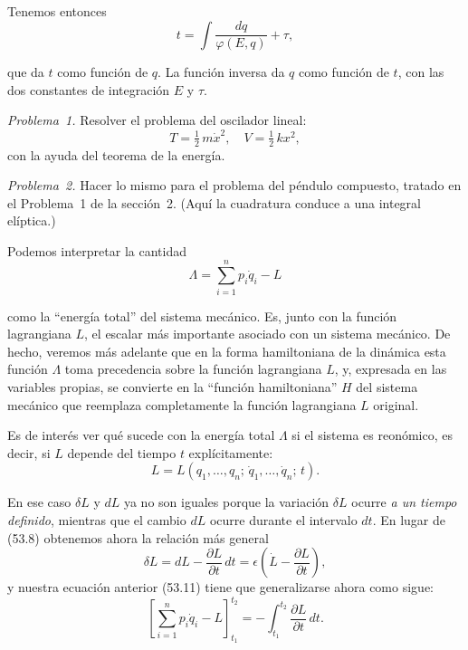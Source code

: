 \documentclass[12pt,a4paper]{book}
\begin{document}
Tenemos entonces
\begin{equation}
t = \int \frac{dq}{\varphi(E, q)} + \tau, \tag{53.19}
\end{equation}

que da $t$ como función de $q$. La función inversa da $q$ como función de $t$, con las dos constantes de integración $E$ y $\tau$.

\textit{Problema~1.} Resolver el problema del oscilador lineal:
\[
T = \tfrac{1}{2}\,m\dot{x}^2, \quad V = \tfrac{1}{2}\,kx^2,
\]
con la ayuda del teorema de la energía.

\textit{Problema~2.} Hacer lo mismo para el problema del péndulo compuesto, tratado en el Problema~1 de la sección~2. (Aquí la cuadratura conduce a una integral elíptica.)

Podemos interpretar la cantidad
\begin{equation}
\Lambda = \sum_{i=1}^{n} p_i \dot{q}_i - L \tag{53.20}
\end{equation}

como la ``energía total'' del sistema mecánico. Es, junto con la función lagrangiana $L$, el escalar más importante asociado con un sistema mecánico. De hecho, veremos más adelante que en la forma hamiltoniana de la dinámica esta función $\Lambda$ toma precedencia sobre la función lagrangiana $L$, y, expresada en las variables propias, se convierte en la ``función hamiltoniana'' $H$ del sistema mecánico que reemplaza completamente la función lagrangiana $L$ original.


Es de interés ver qué sucede con la energía total $\Lambda$ si el sistema es reonómico, es decir, si $L$ depende del tiempo $t$ explícitamente:
\begin{equation}
L = L(q_1, \ldots, q_n;\, \dot{q}_1, \ldots, \dot{q}_n;\, t). \tag{53.21}
\end{equation}

En ese caso $\delta L$ y $dL$ ya no son iguales porque la variación $\delta L$ ocurre \textit{a un tiempo definido}, mientras que el cambio $dL$ ocurre durante el intervalo $dt$. En lugar de (53.8) obtenemos ahora la relación más general
\begin{equation}
\delta L = dL - \frac{\partial L}{\partial t}\,dt = \epsilon\left(\dot{L} - \frac{\partial L}{\partial t}\right), \tag{53.22}
\end{equation}
y nuestra ecuación anterior (53.11) tiene que generalizarse ahora como sigue:
\begin{equation}
\left[ \sum_{i=1}^{n} p_i \dot{q}_i - L \right]_{t_1}^{t_2} = -\int_{t_1}^{t_2} \frac{\partial L}{\partial t}\,dt. \tag{53.23}
\end{equation}
\end{document}
